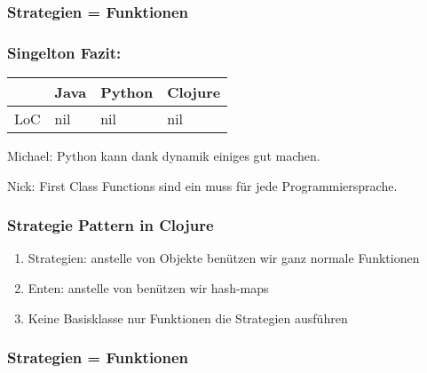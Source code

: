 \documentclass[compress, blue]{beamer}
\begin{document}
\begin{frame}\frametitle{Strategien = Funktionen}
  
\end{frame}





\begin{frame}\frametitle{Singelton Fazit:}
  \begin{tabular}{l | l l l}
     & Java &  Python & Clojure  \\
     \hline
    LoC & nil &  nil & nil  \\
  \end{tabular}
  \vspace{.5cm}

  \begin{block}{Michael:}
    Python kann dank dynamik einiges gut machen.
  \end{block}

  \begin{block}{Nick: }
    First Class Functions sind ein muss für jede Programmiersprache.
  \end{block}

\end{frame}




\begin{frame}\frametitle{Strategie Pattern in Clojure}
  \begin{enumerate}
  \item Strategien: anstelle von Objekte benützen wir ganz normale Funktionen
    \pause
  \item Enten: anstelle von benützen wir hash-maps
    \pause
  \item Keine Basisklasse nur Funktionen die Strategien ausführen 
    \pause
  \end{enumerate}
\end{frame}

\begin{frame}\frametitle{Strategien = Funktionen}
  
\end{frame}


\end{document}
